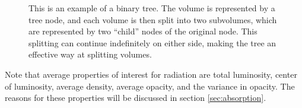 \begin{figure}
\begin{subfigure}[h]{0.45\textwidth}
                \caption{}
                \label{fig:memorytree}
        \end{subfigure}
        \caption[Example of trees]{This is an example of a binary tree. The volume is represented by a tree node, and each volume is then split into two subvolumes, which are represented by two ``child'' nodes of the original node. This splitting can continue indefinitely on either side, making the tree an effective way at splitting volumes.}
        \label{fig:trees}
\end{figure}

Note that average properties of interest for radiation are total luminosity, center of luminosity, average density, average opacity, and the variance in opacity. The reasons for these properties will be discussed in section \ref{sec:absorption}.



